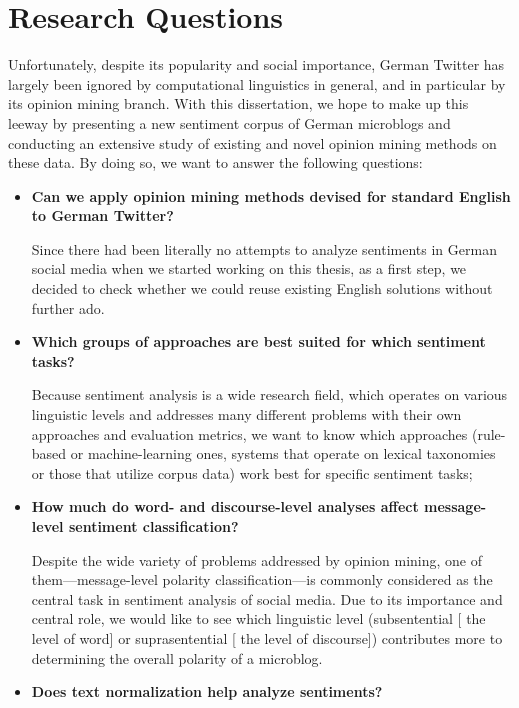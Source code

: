 \section*{Research Questions}

Unfortunately, despite its popularity and social importance, German
Twitter has largely been ignored by computational linguistics in
general, and in particular by its opinion mining branch.  With this
dissertation, we hope to make up this leeway by presenting a new
sentiment corpus of German microblogs and conducting an extensive
study of existing and novel opinion mining methods on these data.  By
doing so, we want to answer the following questions:

\begin{itemize}
\item\textbf{Can we apply opinion mining methods devised for
  standard English to German Twitter?}

  Since there had been literally no attempts to analyze sentiments in
  German social media when we started working on this thesis, as a
  first step, we decided to check whether we could reuse existing
  English solutions without further ado.

\item\textbf{Which groups of approaches are best suited for which
  sentiment tasks?}

  Because sentiment analysis is a wide research field, which operates
  on various linguistic levels and addresses many different problems
  with their own approaches and evaluation metrics, we want to know
  which approaches (rule-based or machine-learning ones, systems that
  operate on lexical taxonomies or those that utilize corpus data)
  work best for specific sentiment tasks;

\item\textbf{How much do word- and discourse-level analyses affect
  message-level sentiment classification?}

  Despite the wide variety of problems addressed by opinion mining,
  one of them---message-level polarity classification---is commonly
  considered as the central task in sentiment analysis of social
  media.  Due to its importance and central role, we would like to see
  which linguistic level (subsentential [\ie{} the level of word] or
  suprasentential [\ie{} the level of discourse]) contributes more to
  determining the overall polarity of a microblog.

\item\textbf{Does text normalization help analyze sentiments?}


\end{itemize}
